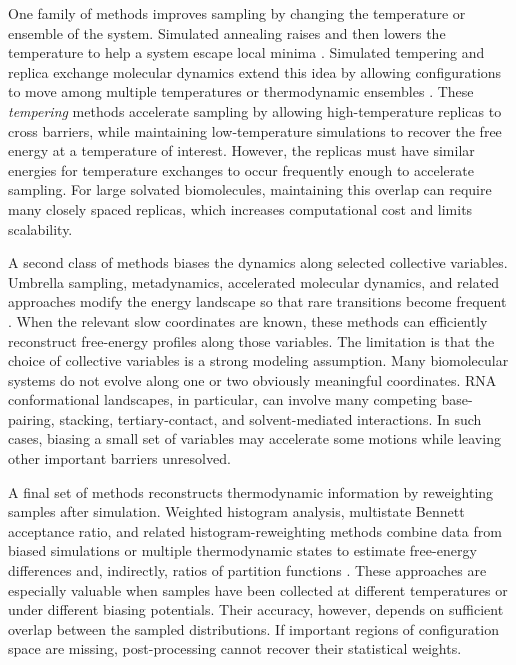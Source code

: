 One family of methods improves sampling by changing the temperature or ensemble of the system. Simulated annealing raises and then lowers the temperature to help a system escape local minima \citep{kirkpatrick1983optimization}. Simulated tempering and replica exchange molecular dynamics extend this idea by allowing configurations to move among multiple temperatures or thermodynamic ensembles \citep{SimulatedTempering,REMD}. These {\it tempering} methods accelerate sampling by allowing high-temperature replicas to cross barriers, while maintaining low-temperature simulations to recover the free energy at a temperature of interest. However, the replicas must have similar energies for temperature exchanges to occur frequently enough to accelerate sampling. For large solvated biomolecules, maintaining this overlap can require many closely spaced replicas, which increases computational cost and limits scalability.

A second class of methods biases the dynamics along selected collective variables. Umbrella sampling, metadynamics, accelerated molecular dynamics, and related approaches modify the energy landscape so that rare transitions become frequent \citep{torrie1977nonphysical,metadynamics-review,abrams2014enhanced}. When the relevant slow coordinates are known, these methods can efficiently reconstruct free-energy profiles along those variables. The limitation is that the choice of collective variables is a strong modeling assumption. Many biomolecular systems do not evolve along one or two obviously meaningful coordinates. RNA conformational landscapes, in particular, can involve many competing base-pairing, stacking, tertiary-contact, and solvent-mediated interactions. In such cases, biasing a small set of variables may accelerate some motions while leaving other important barriers unresolved.

A final set of methods reconstructs thermodynamic information by reweighting samples after simulation. Weighted histogram analysis, multistate Bennett acceptance ratio, and related histogram-reweighting methods combine data from biased simulations or multiple thermodynamic states to estimate free-energy differences and, indirectly, ratios of partition functions \citep{wham,mbar,gallicchio2005temperature}. These approaches are especially valuable when samples have been collected at different temperatures or under different biasing potentials. Their accuracy, however, depends on sufficient overlap between the sampled distributions. If important regions of configuration space are missing, post-processing cannot recover their statistical weights.


